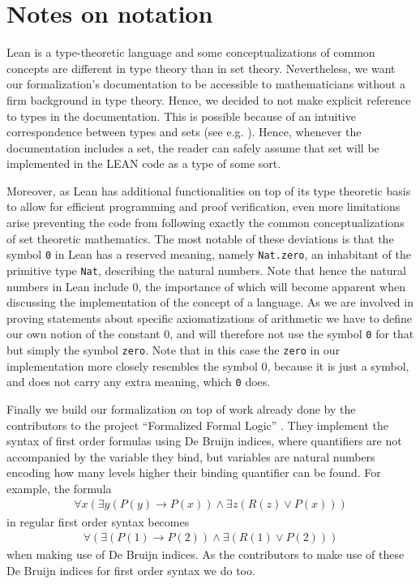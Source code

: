 \chapter{Notes on notation}
Lean is a type-theoretic language and some conceptualizations of common concepts are different in type theory than in set theory. Nevertheless, we want our formalization's documentation to be accessible to mathematicians without a firm background in type theory. Hence, we decided to not make explicit reference to types in the documentation. This is possible because of an intuitive correspondence between types and sets (see e.g. \cite{nederpelt1994}). Hence, whenever the documentation includes a set, the reader can safely assume that set will be implemented in the LEAN code as a type of some sort. 

Moreover, as Lean has additional functionalities on top of its type theoretic basis to allow for efficient programming and proof verification, even more limitations arise preventing the code from following exactly the common conceptualizations of set theoretic mathematics. The most notable of these deviations is that the symbol \lstinline{0} in Lean has a reserved meaning, namely \lstinline{Nat.zero}, an inhabitant of the primitive type \lstinline{Nat}, describing the natural numbers. Note that hence the natural numbers in Lean include 0, the importance of which will become apparent when discussing the implementation of the concept of a language. As we are involved in proving statements about specific axiomatizations of arithmetic we have to define our own notion of the constant 0, and will therefore not use the symbol \lstinline{0} for that but simply the symbol \lstinline{zero}. Note that in this case the \lstinline{zero} in our implementation more closely resembles the symbol 0, because it is just a symbol, and does not carry any extra meaning, which \lstinline{0} does.

Finally we build our formalization on top of work already done by the contributors to the project ``Formalized Formal Logic'' \cite{ffl}. They implement the syntax of first order formulas using De Bruijn indices, where quantifiers are not accompanied by the variable they bind, but variables are natural numbers encoding how many levels higher their binding quantifier can be found. For example, the formula 
\begin{align*}
    \forall x (\exists y (P(y) \to P(x)) \land \exists z(R(z) \lor P(x)))
\end{align*}
in regular first order syntax becomes
\begin{align*}
    \forall (\exists (P(1) \to P(2)) \land \exists (R(1) \lor P(2)))
\end{align*}
when making use of De Bruijn indices. As the contributors to \cite{ffl} make use of these De Bruijn indices for first order syntax we do too. 